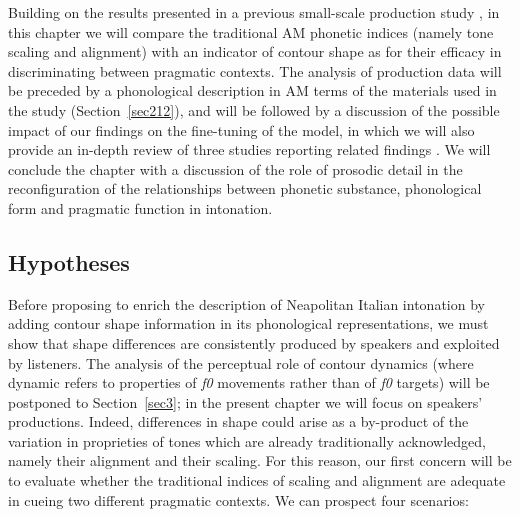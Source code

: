 Building on the results presented in a previous small-scale production study \citep{cangemi2009phonetic}, in this chapter we will compare the traditional AM phonetic indices (namely tone scaling and alignment) with an indicator of contour shape as for their efficacy in discriminating between pragmatic contexts. The analysis of production data will be preceded by a phonological description in AM terms of the materials used in the study (Section~\ref{sec212}), and will be followed by a discussion of the possible impact of our findings on the fine-tuning of the model, in which we will also provide an in-depth review of three studies reporting related findings \citep{dombrowski2005acoustic,petrone2008tonal,petrone2014intonation}. We will conclude the chapter with a discussion of the role of prosodic detail in the reconfiguration of the relationships between phonetic substance, phonological form and pragmatic function in intonation.

\subsection{Hypotheses}\label{sec211}
Before proposing to enrich the description of Neapolitan Italian intonation by adding contour shape information in its phonological representations, we must show that shape differences are consistently produced by speakers and exploited by listeners. The analysis of the perceptual role of contour dynamics (where dynamic refers to properties of \textit{f0} movements rather than of \textit{f0} targets) will be postponed to Section~\ref{sec3}; in the present chapter we will focus on speakers' productions. Indeed, differences in shape could arise as a by-product of the variation in proprieties of tones which are already traditionally acknowledged, namely their alignment and their scaling. For this reason, our first concern will be to evaluate whether the traditional indices of scaling and alignment are adequate in cueing two different pragmatic contexts. We can prospect four scenarios:

